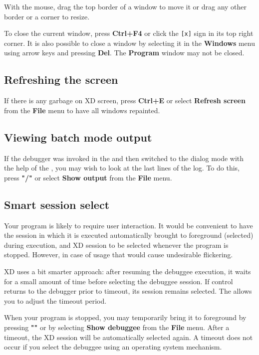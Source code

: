 With the mouse, drag the top border of a window to move it or
drag any other border or a corner to resize.

To close the current window, press {\bf Ctrl+F4} or click the
\verb'[x]' sign in its top right corner. It is also possible to close
a window by selecting it in the {\bf Windows} menu using arrow keys
and pressing {\bf Del}. The {\bf Program} window may not be closed.

\subsection{Refreshing the screen}
\label{dialog:intro:refresh}

If there is any garbage on XD screen, press {\bf Ctrl+E}
or select {\bf Refresh screen} from the {\bf File} menu to have
all windows repainted.

\subsection{Viewing batch mode output}
\label{dialog:intro:log}

If the debugger was invoked in the 
and then switched to the dialog mode with the help of the
, you may wish to look at the
last lines of the log. To do this, press {\bf "/"} or select
{\bf Show output} from the {\bf File} menu.

\subsection{Smart session select}
\label{dialog:intro:sss}

Your program is likely to require user interaction. It would be convenient
to have the session in which it is executed automatically brought
to foreground (selected) during execution, and XD session to be selected
whenever the program is stopped. However, in case of
 usage that would cause
undesirable flickering.

XD uses a bit smarter approach: after resuming the debuggee execution,
it waits for a small amount of time before selecting the debuggee session.
If control returns to the debugger prior to timeout, its session remains
selected. The 
allows you to adjust the timeout period.

When your program is stopped, you may temporarily bring it to foreground
by pressing {\bf "\bs{}"} or by selecting {\bf Show debuggee} from the
{\bf File} menu. After a timeout, the XD session will be automatically
selected again. A timeout does not occur if you select the debuggee
using an operating system mechanism.

